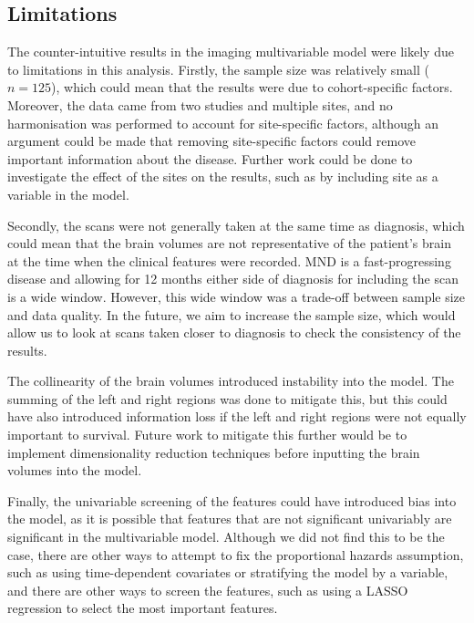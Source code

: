 \subsection{Limitations}
The counter-intuitive results in the imaging multivariable model were likely due to limitations in this analysis.
Firstly, the sample size was relatively small ($n=125$), which could mean that the results were due to cohort-specific factors.
Moreover, the data came from two studies and multiple sites, and no harmonisation was performed to account for site-specific factors, although an argument could be made that removing site-specific factors could remove important information about the disease.
Further work could be done to investigate the effect of the sites on the results, such as by including site as a variable in the model.

Secondly, the scans were not generally taken at the same time as diagnosis, which could mean that the brain volumes are not representative of the patient's brain at the time when the clinical features were recorded.
MND is a fast-progressing disease and allowing for 12 months either side of diagnosis for including the scan is a wide window.
However, this wide window was a trade-off between sample size and data quality.
In the future, we aim to increase the sample size, which would allow us to look at scans taken closer to diagnosis to check the consistency of the results.

The collinearity of the brain volumes introduced instability into the model.
The summing of the left and right regions was done to mitigate this, but this could have also introduced information loss if the left and right regions were not equally important to survival.
Future work to mitigate this further would be to implement dimensionality reduction techniques before inputting the brain volumes into the model.

Finally, the univariable screening of the features could have introduced bias into the model, as it is possible that features that are not significant univariably are significant in the multivariable model.
Although we did not find this to be the case, there are other ways to attempt to fix the proportional hazards assumption, such as using time-dependent covariates or stratifying the model by a variable, and there are other ways to screen the features, such as using a LASSO regression to select the most important features.


